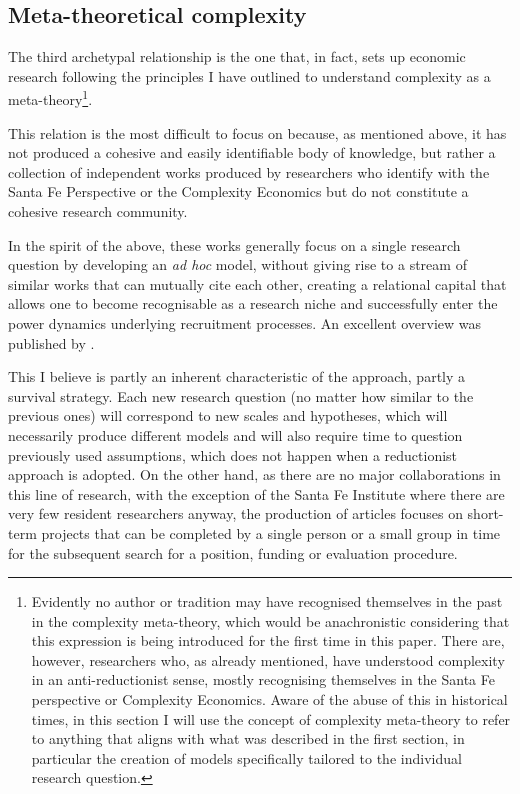 \documentclass[a4paper, headings=standardclasses]{scrartcl}
\begin{document}
\subsection{Meta-theoretical complexity}
The third archetypal relationship is the one that, in fact, sets up economic research following the principles I have outlined to understand complexity as a meta-theory\footnote{Evidently no author or tradition may have recognised themselves in the past in the complexity meta-theory, which would be anachronistic considering that this expression is being introduced for the first time in this paper. There are, however, researchers who, as already mentioned, have understood complexity in an anti-reductionist sense, mostly recognising themselves in the Santa Fe perspective or Complexity Economics. Aware of the abuse of this in historical times, in this section I will use the concept of complexity meta-theory to refer to anything that aligns with what was described in the first section, in particular the creation of models specifically tailored to the individual research question.}.

This relation is the most difficult to focus on because, as mentioned above, it has not produced a cohesive and easily identifiable body of knowledge, but rather a collection of independent works produced by researchers who identify with the Santa Fe Perspective or the Complexity Economics but do not constitute a cohesive research community.

In the spirit of the above, these works generally focus on a single research question by developing an \textit{ad hoc} model, without giving rise to a stream of similar works that can mutually cite each other, creating a relational capital that allows one to become recognisable as a research niche and successfully enter the power dynamics underlying recruitment processes. An excellent overview was published by \textcite{arthur2021}.

This I believe is partly an inherent characteristic of the approach, partly a survival strategy.
Each new research question (no matter how similar to the previous ones) will correspond to new scales and hypotheses, which will necessarily produce different models and will also require time to question previously used assumptions, which does not happen when a reductionist approach is adopted.
On the other hand, as there are no major collaborations in this line of research, with the exception of the Santa Fe Institute where there are very few resident researchers anyway, the production of articles focuses on short-term projects that can be completed by a single person or a small group in time for the subsequent search for a position, funding or evaluation procedure.
\end{document}

